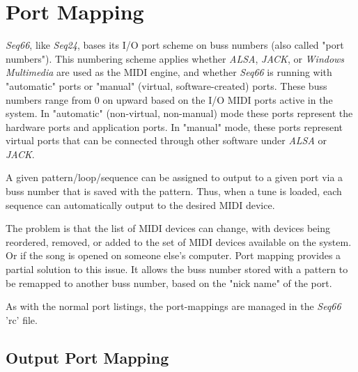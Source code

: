 %
%
%

\section{Port Mapping}
\label{sec:port_mapping}

   \textsl{Seq66}, like \textsl{Seq24}, bases its I/O port scheme on buss
   numbers (also called "port numbers").  This numbering scheme applies whether
   \textsl{ALSA}, \textsl{JACK}, or \textsl{Windows Multimedia}
   are used as the MIDI engine, and whether \textsl{Seq66} is running with
   "automatic" ports or "manual" (virtual, software-created) ports.
   These buss numbers range from 0 on upward
   based on the I/O MIDI ports active in the system.
   In "automatic" (non-virtual, non-manual) mode
   these ports represent the hardware ports and application ports.
   In "manual" mode, these ports represent virtual ports
   that can be connected through other software under \textsl{ALSA} or
   \textsl{JACK}.

   A given pattern/loop/sequence can be assigned to output to a given port via
   a buss number that is saved with the pattern.  Thus, when a tune is loaded,
   each sequence can automatically output to the desired MIDI device.

   The problem is that the list of MIDI devices can change, with devices being
   reordered, removed, or added to the set of MIDI devices available on the
   system.  Or if the song is opened on someone else's computer.
   Port mapping provides a partial solution to this issue.  It allows
   the buss number stored with a pattern to be remapped to another buss number,
   based on the "nick name" of the port.

   As with the normal port listings, the port-mappings are managed in the
   \textsl{Seq66} 'rc' file.

\subsection{Output Port Mapping}
\label{subsec:output_port_mapping}

